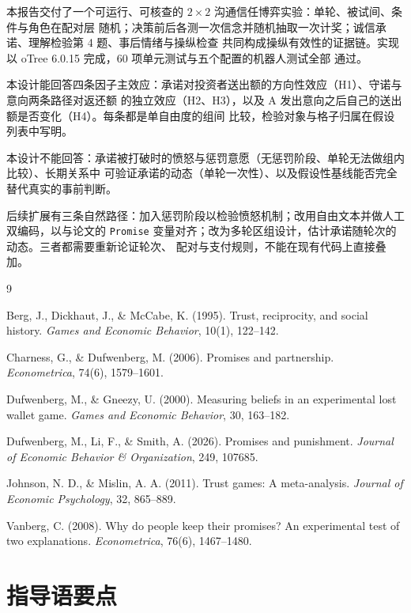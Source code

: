 \documentclass[10pt,a4paper]{ctexart}
\begin{document}
本报告交付了一个可运行、可核查的 $2\times2$ 沟通信任博弈实验：单轮、被试间、条件与角色在配对层
随机；决策前后各测一次信念并随机抽取一次计奖；诚信承诺、理解检验第 4 题、事后情绪与操纵检查
共同构成操纵有效性的证据链。实现以 oTree 6.0.15 完成，60 项单元测试与五个配置的机器人测试全部
通过。

本设计能回答四条因子主效应：承诺对投资者送出额的方向性效应（H1）、守诺与意向两条路径对返还额
的独立效应（H2、H3），以及 A 发出意向之后自己的送出额是否变化（H4）。每条都是单自由度的组间
比较，检验对象与格子归属在假设列表中写明。

本设计不能回答：承诺被打破时的愤怒与惩罚意愿（无惩罚阶段、单轮无法做组内比较）、长期关系中
可验证承诺的动态（单轮一次性）、以及假设性基线能否完全替代真实的事前判断。

后续扩展有三条自然路径：加入惩罚阶段以检验愤怒机制；改用自由文本并做人工双编码，以与论文的
\texttt{Promise} 变量对齐；改为多轮区组设计，估计承诺随轮次的动态。三者都需要重新论证轮次、
配对与支付规则，不能在现有代码上直接叠加。

\begin{thebibliography}{9}\footnotesize
\setlength{\itemsep}{2pt}

Berg, J., Dickhaut, J., \& McCabe, K. (1995). Trust, reciprocity, and social history.
\textit{Games and Economic Behavior}, 10(1), 122--142.

Charness, G., \& Dufwenberg, M. (2006). Promises and partnership.
\textit{Econometrica}, 74(6), 1579--1601.

Dufwenberg, M., \& Gneezy, U. (2000). Measuring beliefs in an experimental lost wallet game.
\textit{Games and Economic Behavior}, 30, 163--182.

Dufwenberg, M., Li, F., \& Smith, A. (2026). Promises and punishment.
\textit{Journal of Economic Behavior \& Organization}, 249, 107685.

Johnson, N. D., \& Mislin, A. A. (2011). Trust games: A meta-analysis.
\textit{Journal of Economic Psychology}, 32, 865--889.

Vanberg, C. (2008). Why do people keep their promises? An experimental test of two explanations.
\textit{Econometrica}, 76(6), 1467--1480.

\end{thebibliography}

\newpage
\appendix

\section{指导语要点}
\end{document}
